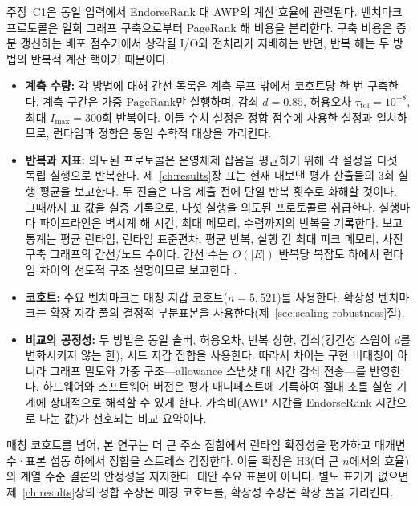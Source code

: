 
주장~C1은 동일 입력에서 EndorseRank 대 AWP의 계산 효율에 관련된다. 벤치마크 프로토콜은 일회 그래프 구축으로부터 PageRank 해 비용을 분리한다. 구축 비용은 증분 갱신하는 배포 점수기에서 상각될 I/O와 전처리가 지배하는 반면, 반복 해는 두 방법의 반복적 계산 핵이기 때문이다.

\begin{itemize}
\item \textbf{계측 수량:} 각 방법에 대해 간선 목록은 계측 루프 밖에서 코호트당 한 번 구축한다. 계측 구간은 가중 PageRank만 실행하며, 감쇠 $d=0.85$, 허용오차 $\tau_{\mathrm{tol}}=10^{-8}$, 최대 $I_{\max}=300$회 반복이다. 이들 수치 설정은 정합 점수에 사용한 설정과 일치하므로, 런타임과 정합은 동일 수학적 대상을 가리킨다.

\item \textbf{반복과 지표:} 의도된 프로토콜은 운영체제 잡음을 평균하기 위해 각 설정을 다섯 독립 실행으로 반복한다. 제~\ref{ch:results}장 표는 현재 내보낸 평가 산출물의 3회 실행 평균을 보고한다. 두 진술은 다음 제출 전에 단일 반복 횟수로 화해할 것이다. 그때까지 표 값을 실증 기록으로, 다섯 실행을 의도된 프로토콜로 취급한다. 실행마다 파이프라인은 벽시계 해 시간, 최대 메모리, 수렴까지의 반복을 기록한다. 보고 통계는 평균 런타임, 런타임 표준편차, 평균 반복, 실행 간 최대 피크 메모리, 사전 구축 그래프의 간선/노드 수이다. 간선 수는 $O(|E|)$ 반복당 복잡도 하에서 런타임 차이의 선도적 구조 설명이므로 보고한다 .

\item \textbf{코호트:} 주요 벤치마크는 매칭 지갑 코호트($n=5{,}521$)를 사용한다. 확장성 벤치마크는 확장 지갑 풀의 결정적 부분표본을 사용한다(제~\ref{sec:scaling-robustness}절).

\item \textbf{비교의 공정성:} 두 방법은 동일 솔버, 허용오차, 반복 상한, 감쇠(강건성 스윕이 $d$를 변화시키지 않는 한), 시드 지갑 집합을 사용한다. 따라서 차이는 구현 비대칭이 아니라 그래프 밀도와 가중 구조---allowance 스냅샷 대 시간 감쇠 전송---를 반영한다. 하드웨어와 소프트웨어 버전은 평가 매니페스트에 기록하여 절대 초를 실험 기계에 상대적으로 해석할 수 있게 한다. 가속비(AWP 시간을 EndorseRank 시간으로 나눈 값)가 선호되는 비교 요약이다.

\end{itemize}


매칭 코호트를 넘어, 본 연구는 더 큰 주소 집합에서 런타임 확장성을 평가하고 매개변수·표본 섭동 하에서 정합을 스트레스 검정한다. 이들 확장은 H3(더 큰 $n$에서의 효율)와 계열 수준 결론의 안정성을 지지한다. 대안 주요 표본이 아니다. 별도 표기가 없으면 제~\ref{ch:results}장의 정합 주장은 매칭 코호트를, 확장성 주장은 확장 풀을 가리킨다.

